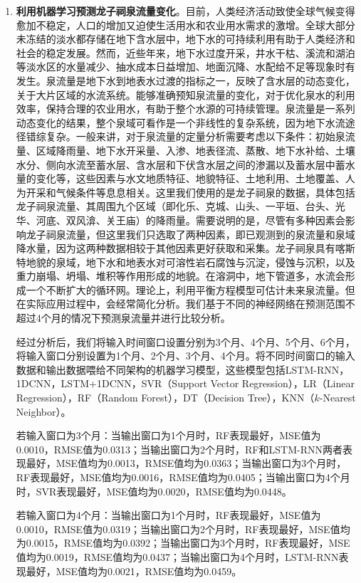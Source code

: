 \begin{enumerate}
    \item \textbf{利用机器学习预测龙子祠泉流量变化}。目前，人类经济活动致使全球气候变得愈加不稳定，人口的增加又迫使生活用水和农业用水需求的激增。全球大部分未冻结的淡水都存储在地下含水层中，地下水的可持续利用有助于人类经济和社会的稳定发展。然而，近些年来，地下水过度开采，井水干枯、溪流和湖泊等淡水区的水量减少、抽水成本日益增加、地面沉降、水配给不足等现象时有发生。泉流量是地下水到地表水过渡的指标之一，反映了含水层的动态变化，关于大片区域的水流系统。能够准确预知泉流量的变化，对于优化泉水的利用效率，保持合理的农业用水，有助于整个水源的可持续管理。泉流量是一系列动态变化的结果，整个泉域可看作是一个非线性的复杂系统，因为地下水流途径错综复杂。一般来讲，对于泉流量的定量分析需要考虑以下条件：初始泉流量、区域降雨量、地下水开采量、入渗、地表径流、蒸散、地下水补给、土壤水分、侧向水流至蓄水层、含水层和下伏含水层之间的渗漏以及蓄水层中蓄水量的变化等，这些因素与水文地质特征、地貌特征、土地利用、土地覆盖、人为开采和气候条件等息息相关。这里我们使用的是龙子祠泉的数据，具体包括龙子祠泉流量、其周围九个区域（即化乐、克城、山头、一平垣、台头、光华、河底、双风渰、关王庙）的降雨量。需要说明的是，尽管有多种因素会影响龙子祠泉流量，但这里我们只选取了两种因素，即已观测到的泉流量和泉域降水量，因为这两种数据相较于其他因素更好获取和采集。龙子祠泉具有喀斯特地貌的泉域，地下水和地表水对可溶性岩石腐蚀与沉淀，侵蚀与沉积，以及重力崩塌、坍塌、堆积等作用形成的地貌。在溶洞中，地下管道多，水流会形成一个不断扩大的循环网。理论上，利用平衡方程模型可估计未来泉流量。但在实际应用过程中，会经常简化分析。我们基于不同的神经网络在预测范围不超过4个月的情况下预测泉流量并进行比较分析。
    
    经过分析后，我们将输入时间窗口设置分别为3个月、4个月、5个月、6个月，将输入窗口分别设置为1个月、2个月、3个月、4个月。将不同时间窗口的输入数据和输出数据喂给不同架构的机器学习模型，这些模型包括LSTM-RNN，1DCNN，LSTM+1DCNN，SVR（Support Vector Regression），LR（Linear Regression），RF（Random Forest），DT（Decision Tree），KNN（$k$-Nearest Neighbor）。
    
    若输入窗口为3个月：当输出窗口为1个月时，RF表现最好，MSE值为0.0010，RMSE值为0.0313；当输出窗口为2个月时，RF和LSTM-RNN两者表现最好，MSE值均为0.0013，RMSE值均为0.0363；当输出窗口为3个月时，RF表现最好，MSE值均为0.0016，RMSE值均为0.0405；当输出窗口为4个月时，SVR表现最好，MSE值均为0.0020，RMSE值均为0.0448。
    
    若输入窗口为4个月：当输出窗口为1个月时，RF表现最好，MSE值为0.0010，RMSE值为0.0319；当输出窗口为2个月时，RF表现最好，MSE值均为0.0015，RMSE值均为0.0392；当输出窗口为3个月时，RF表现最好，MSE值均为0.0019，RMSE值均为0.0437；当输出窗口为4个月时，LSTM-RNN表现最好，MSE值均为0.0021，RMSE值均为0.0459。
  

\end{enumerate}
